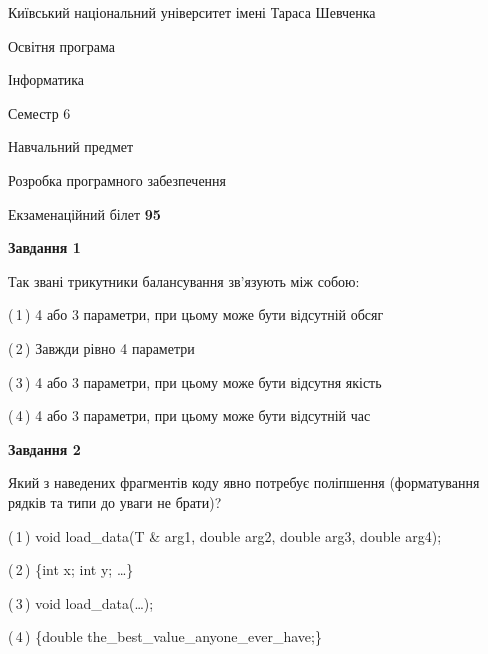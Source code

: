 \documentclass[10pt, ukrainian]{article}
\begin{document}
{{\begin {small}\par
{ \center  Київський національний університет імені Тараса Шевченка \par}
{\parbox {5 cm}{Освітня програма \hfill}{\parbox {7 cm}{Інформатика \hfill}}\parbox {6 cm}{\hfill Семестр 6}}\par
{\parbox {5 cm} {Навчальний предмет \hfill}\parbox {7 cm}{Розробка програмного забезпечення \hfill}\parbox {6cm}{\hfill}\par}\vspace{-7pt} \end{small}}{\center Екзаменаційний білет \No \textbf
{ 95 }\par}}
{
\begin {large}
{\begin {center}\textbf{Завдання 1}\end {center}}\par
Так звані трикутники балансування зв'язують між собою:\par
\vspace{2mm}



(\,1\,) 4 або 3 параметри, при цьому може бути відсутній обсяг %



(\,2\,) Завжди рівно 4 параметри%



(\,3\,) 4 або 3 параметри, при цьому може бути відсутня якість%



(\,4\,) 4 або 3 параметри, при цьому може бути відсутній час%


{\begin {center}\textbf{Завдання 2}\end {center}}\par
Який з наведених фрагментів коду явно потребує поліпшення (форматування рядків та типи до уваги не брати)?\par
\vspace{2mm}



(\,1\,) void load\_data(T \& arg1, double arg2, double arg3, double arg4); %



(\,2\,) \{int x; int y; …\}%



(\,3\,) void load\_data(…);%



(\,4\,) \{double the\_best\_value\_anyone\_ever\_have;\} %



\end{large}}
\end{document}
